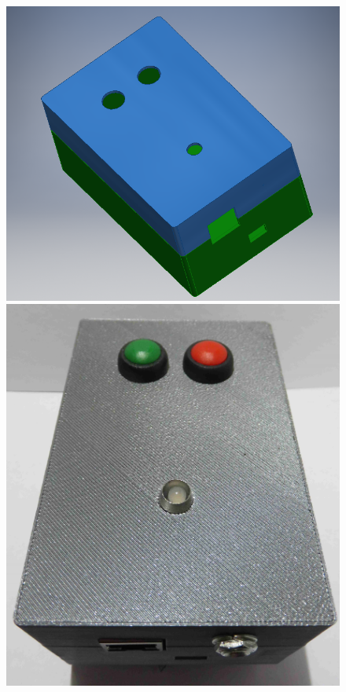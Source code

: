 \begin{figure}[hbtp]
\centering
\begin{minipage}[c]{\textwidth/2-.7cm}
\includegraphics[width=\textwidth]{img/foto/server_navrh.png}
\end{minipage}
\begin{minipage}[c]{\textwidth/2-.7cm}
\includegraphics[width=\textwidth]{img/foto/server_realizace.jpg}

\end{minipage}
\end{figure}

